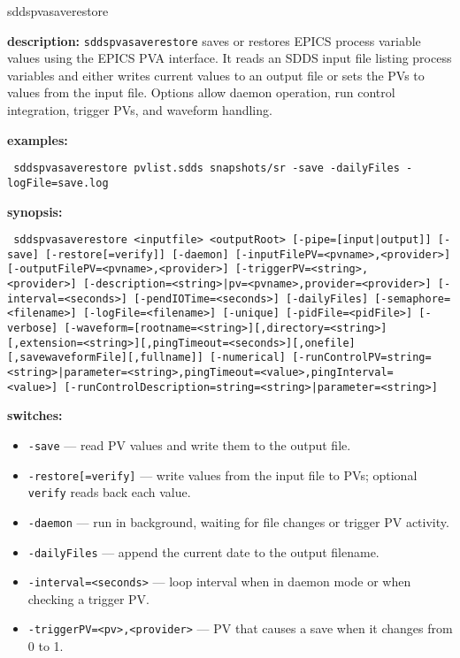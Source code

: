 \begin{sddsprog}{sddspvasaverestore}
\item \textbf{description:}
  \verb+sddspvasaverestore+ saves or restores EPICS process variable values using the EPICS PVA
  interface. It reads an SDDS input file listing process variables and either writes current
  values to an output file or sets the PVs to values from the input file. Options allow daemon
  operation, run control integration, trigger PVs, and waveform handling.
\item \textbf{examples:}
\begin{flushleft}{\tt
sddspvasaverestore pvlist.sdds snapshots/sr -save -dailyFiles -logFile=save.log\\
}\end{flushleft}
\item \textbf{synopsis:}
\begin{flushleft}{\tt
sddspvasaverestore <inputfile> <outputRoot> [-pipe=[input|output]]\
  [-save] [-restore[=verify]]\
  [-daemon]\
    [-inputFilePV=<pvname>,<provider>] [-outputFilePV=<pvname>,<provider>]\
    [-triggerPV=<string>,<provider>]\
    [-description=<string>|pv=<pvname>,provider=<provider>]\
  [-interval=<seconds>] [-pendIOTime=<seconds>]\
  [-dailyFiles] [-semaphore=<filename>] [-logFile=<filename>]\
  [-unique] [-pidFile=<pidFile>] [-verbose]\
  [-waveform=[rootname=<string>][,directory=<string>][,extension=<string>][,pingTimeout=<seconds>][,onefile][,savewaveformFile][,fullname]]\
  [-numerical]\
  [-runControlPV={string=<string>|parameter=<string>},pingTimeout=<value>,pingInterval=<value>]\
  [-runControlDescription={string=<string>|parameter=<string>}]
}\end{flushleft}
\item \textbf{switches:}
  \begin{itemize}
  \item {\tt -save} --- read PV values and write them to the output file.
  \item {\tt -restore[=verify]} --- write values from the input file to PVs; optional {\tt verify} reads back each value.
  \item {\tt -daemon} --- run in background, waiting for file changes or trigger PV activity.
  \item {\tt -dailyFiles} --- append the current date to the output filename.
  \item {\tt -interval=<seconds>} --- loop interval when in daemon mode or when checking a trigger PV.
  \item {\tt -triggerPV=<pv>,<provider>} --- PV that causes a save when it changes from 0 to 1.

\end{itemize}
\end{sddsprog}
